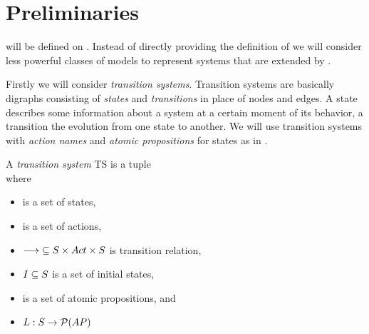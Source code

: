 \documentclass[preview]{standalone}
\begin{document}
\section{Preliminaries} \label{ch:prelim}

\viewsNC will be defined on \chgphsN. Instead of directly providing the definition of \achgphN we will consider less powerful classes of models to represent systems that are extended by \chgphsN.

Firstly we will consider \emph{transition systems}. Transition systems are basically digraphs consisting of \emph{states} and \emph{transitions} in place of nodes and edges. A state describes some information about a system at a certain moment of its behavior, a transition the evolution from one state to another. We will use transition systems with \emph{action names} and \emph{atomic propositions} for states as in \cite{Baier2008}.

\begin{definition}
	A \emph{transition system} TS is a tuple \\ \transitionsystem where
	\begin{itemize}
		\item \states is a set of states,
		\item \actions is a set of actions,
		\item ${\longrightarrow} \subseteq {S} \times {Act} \times {S}$ is transition relation,
		\item ${I} \subseteq {S}$ is a set of initial states,
		\item \atomicprops is a set of atomic propositions, and
		\item ${L} : {S} \to {\mathcal{P}(\ensuremath{{AP}})}$
	\end{itemize}
\end{definition}

\end{document}
